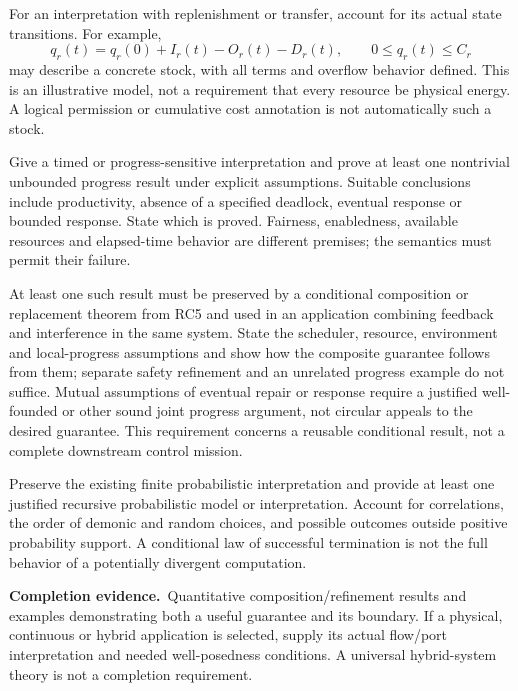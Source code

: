 \documentclass[11pt,a4paper]{article}
\newcommand{\deliver}{\par\textbf{Completion evidence.}\ }
\begin{document}
For an interpretation with replenishment or transfer, account for its actual state transitions. For example,
\[
q_r(t)=q_r(0)+I_r(t)-O_r(t)-D_r(t),\qquad
0\le q_r(t)\le C_r
\]
may describe a concrete stock, with all terms and overflow behavior defined. This is an illustrative model, not a requirement that every resource be physical energy. A logical permission or cumulative cost annotation is not automatically such a stock.

Give a timed or progress-sensitive interpretation and prove at least one nontrivial unbounded progress result under explicit assumptions. Suitable conclusions include productivity, absence of a specified deadlock, eventual response or bounded response. State which is proved. Fairness, enabledness, available resources and elapsed-time behavior are different premises; the semantics must permit their failure.

At least one such result must be preserved by a conditional composition or replacement theorem from RC5 and used in an application combining feedback and interference in the same system. State the scheduler, resource, environment and local-progress assumptions and show how the composite guarantee follows from them; separate safety refinement and an unrelated progress example do not suffice. Mutual assumptions of eventual repair or response require a justified well-founded or other sound joint progress argument, not circular appeals to the desired guarantee. This requirement concerns a reusable conditional result, not a complete downstream control mission.

Preserve the existing finite probabilistic interpretation and provide at least one justified recursive probabilistic model or interpretation. Account for correlations, the order of demonic and random choices, and possible outcomes outside positive probability support. A conditional law of successful termination is not the full behavior of a potentially divergent computation.

\deliver Quantitative composition/refinement results and examples demonstrating both a useful guarantee and its boundary. If a physical, continuous or hybrid application is selected, supply its actual flow/port interpretation and needed well-posedness conditions. A universal hybrid-system theory is not a completion requirement.
\end{document}
